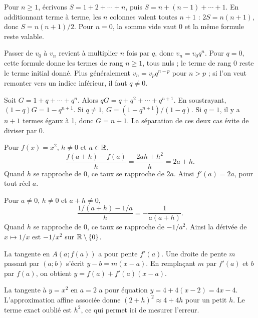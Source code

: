 \begin{demonstration}
Pour $n\geq1$, écrivons $S=1+2+\cdots+n$, puis $S=n+(n-1)+\cdots+1$.
En additionnant terme à terme, les $n$ colonnes valent toutes $n+1$ :
$2S=n(n+1)$, donc $S=n(n+1)/2$.
Pour $n=0$, la somme vide vaut 0 et la même formule reste valable.
\end{demonstration}
\begin{demonstration}
Passer de $v_0$ à $v_n$ revient à multiplier $n$ fois par $q$, donc
$v_n=v_0q^n$. Pour $q=0$, cette formule donne les termes de rang $n\geq1$,
tous nuls ; le terme de rang 0 reste le terme initial donné.
Plus généralement $v_n=v_pq^{n-p}$ pour $n>p$ ; si l'on veut remonter
vers un indice inférieur, il faut $q\neq0$.
\end{demonstration}
\begin{demonstration}
Soit $G=1+q+\cdots+q^n$. Alors $qG=q+q^2+\cdots+q^{n+1}$.
En soustrayant, $(1-q)G=1-q^{n+1}$.
Si $q\neq1$, $G=(1-q^{n+1})/(1-q)$. Si $q=1$, il y a $n+1$ termes
égaux à 1, donc $G=n+1$. La séparation de ces deux cas évite de diviser par 0.
\end{demonstration}
\clearpage
{}
\label{dem-derivation}
\begin{demonstration}
Pour $f(x)=x^2$, $h\neq0$ et $a\in\mathbb{R}$,
\[\frac{f(a+h)-f(a)}h=\frac{2ah+h^2}h=2a+h.\]
Quand $h$ se rapproche de 0, ce taux se rapproche de $2a$.
Ainsi $f'(a)=2a$, pour tout réel $a$.
\end{demonstration}
\begin{demonstration}
Pour $a\neq0$, $h\neq0$ et $a+h\neq0$,
\[\frac{1/(a+h)-1/a}{h}=-\frac1{a(a+h)}.\]
Quand $h$ se rapproche de 0, ce taux se rapproche de $-1/a^2$.
Ainsi la dérivée de $x\mapsto1/x$ est $-1/x^2$ sur $\mathbb{R}\setminus\{0\}$.
\end{demonstration}
\begin{demonstration}
La tangente en $A(a;f(a))$ a pour pente $f'(a)$.
Une droite de pente $m$ passant par $(a;b)$ s'écrit $y-b=m(x-a)$.
En remplaçant $m$ par $f'(a)$ et $b$ par $f(a)$, on obtient
$y=f(a)+f'(a)(x-a)$.
\end{demonstration}
\begin{exemple}
La tangente à $y=x^2$ en $a=2$ a pour équation $y=4+4(x-2)=4x-4$.
L'approximation affine associée donne $(2+h)^2\approx4+4h$ pour un petit $h$.
Le terme exact oublié est $h^2$, ce qui permet ici de mesurer l'erreur.
\end{exemple}
